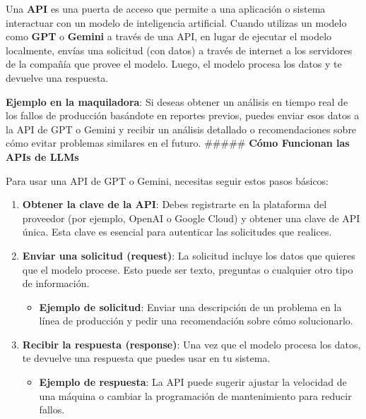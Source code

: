\documentclass[
  10pt,
  letterpaper,
]{book}
\providecommand{\tightlist}{%
  \setlength{\itemsep}{0pt}\setlength{\parskip}{0pt}}\usepackage{longtable,booktabs,array}
\begin{document}
Una \textbf{API} es una puerta de acceso que permite a una aplicación o
sistema interactuar con un modelo de inteligencia artificial. Cuando
utilizas un modelo como \textbf{GPT} o \textbf{Gemini} a través de una
API, en lugar de ejecutar el modelo localmente, envías una solicitud
(con datos) a través de internet a los servidores de la compañía que
provee el modelo. Luego, el modelo procesa los datos y te devuelve una
respuesta.

\textbf{Ejemplo en la maquiladora}: Si deseas obtener un análisis en
tiempo real de los fallos de producción basándote en reportes previos,
puedes enviar esos datos a la API de GPT o Gemini y recibir un análisis
detallado o recomendaciones sobre cómo evitar problemas similares en el
futuro. \#\#\#\#\# \textbf{Cómo Funcionan las APIs de LLMs}

Para usar una API de GPT o Gemini, necesitas seguir estos pasos básicos:

\begin{enumerate}
\def\labelenumi{\arabic{enumi}.}
\item
  \textbf{Obtener la clave de la API}: Debes registrarte en la
  plataforma del proveedor (por ejemplo, OpenAI o Google Cloud) y
  obtener una clave de API única. Esta clave es esencial para autenticar
  las solicitudes que realices.
\item
  \textbf{Enviar una solicitud (request)}: La solicitud incluye los
  datos que quieres que el modelo procese. Esto puede ser texto,
  preguntas o cualquier otro tipo de información.

  \begin{itemize}
  \tightlist
  \item
    \textbf{Ejemplo de solicitud}: Enviar una descripción de un problema
    en la línea de producción y pedir una recomendación sobre cómo
    solucionarlo.
  \end{itemize}
\item
  \textbf{Recibir la respuesta (response)}: Una vez que el modelo
  procesa los datos, te devuelve una respuesta que puedes usar en tu
  sistema.

  \begin{itemize}
  \tightlist
  \item
    \textbf{Ejemplo de respuesta}: La API puede sugerir ajustar la
    velocidad de una máquina o cambiar la programación de mantenimiento
    para reducir fallos.
  \end{itemize}
\end{enumerate}
\end{document}
